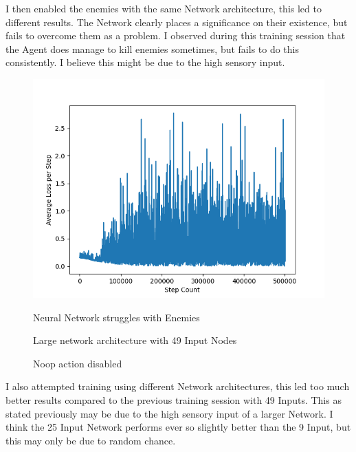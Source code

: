 \begin{flushleft}
        I then enabled the enemies with the same Network architecture, this led to different results. The Network clearly places a significance on their
        existence, but fails to overcome them as a problem. I observed during this training session that the Agent does manage to kill enemies sometimes, but 
        fails to do this consistently. I believe this might be due to the high sensory input.

        \begin{figure}[H]
            \centering
            \includegraphics[width=12cm]{Images/Evaluation/EnemiesEnabled.png}
            \caption*{Neural Network struggles with Enemies}
            \caption*{Large network architecture with 49 Input Nodes} 
            \caption*{Noop action disabled}
        \end{figure}

        I also attempted training using different Network architectures, this led too much better results compared to the previous training session with 49 Inputs.
        This as stated previously may be due to the high sensory input of a larger Network. I think the 25 Input Network performs ever so slightly better than
        the 9 Input, but this may only be due to random chance.


\end{flushleft}
